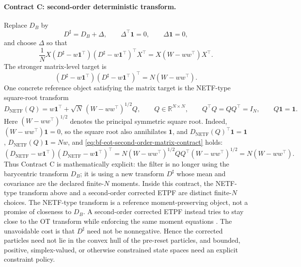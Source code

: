 \paragraph{Contract C: second-order deterministic transform.}
Replace \(D_B\) by
\begin{equation}
\label{eq:bf-eot-second-order-correction}
  D^\sharp = D_B+\Delta,
  \qquad
  \Delta^\top\mathbf 1=0,
  \qquad
  \Delta\mathbf 1=0,
\end{equation}
and choose \(\Delta\) so that
\begin{equation}
\label{eq:bf-eot-second-order-correction-cov}
  \frac1N X(D^\sharp-w\mathbf 1^\top)
  (D^\sharp-w\mathbf 1^\top)^\top X^\top
  =
  X(W-ww^\top)X^\top.
\end{equation}
The stronger matrix-level target is
\begin{equation}
\label{eq:bf-eot-second-order-correction-matrix}
  (D^\sharp-w\mathbf 1^\top)(D^\sharp-w\mathbf 1^\top)^\top
  =
  N(W-ww^\top).
\end{equation}
One concrete reference object satisfying the matrix target is the NETF-type
square-root transform
\begin{equation}
\label{eq:bf-eot-netf-reference-transform}
  D_{\mathrm{NETF}}(Q)
  =
  w\mathbf 1^\top
  +
  \sqrt{N}\,(W-ww^\top)^{1/2}Q,
  \qquad
  Q\in\mathbb R^{N\times N},
  \qquad
  Q^\top Q=QQ^\top=I_N,
  \qquad
  Q\mathbf 1=\mathbf 1.
\end{equation}
Here \((W-ww^\top)^{1/2}\) denotes the principal symmetric square root.  Indeed,
\((W-ww^\top)\mathbf 1=0\), so the square root also annihilates \(\mathbf 1\), and
\(D_{\mathrm{NETF}}(Q)^\top\mathbf 1=\mathbf 1\),
\(D_{\mathrm{NETF}}(Q)\mathbf 1=Nw\), and
\eqref{eq:bf-eot-second-order-matrix-contract} holds:
\[
  (D_{\mathrm{NETF}}-w\mathbf 1^\top)
  (D_{\mathrm{NETF}}-w\mathbf 1^\top)^\top
  =
  N(W-ww^\top)^{1/2}QQ^\top(W-ww^\top)^{1/2}
  =
  N(W-ww^\top).
\]
Thus Contract C is mathematically explicit: the filter is no longer using the
barycentric transform \(D_B\); it is using a new transform \(D^\sharp\) whose
mean and covariance are the declared finite-\(N\) moments.  Inside this contract,
the NETF-type transform above and a second-order corrected ETPF are distinct
finite-\(N\) choices.  The NETF-type transform is a reference moment-preserving
object, not a promise of closeness to \(D_B\).  A second-order corrected ETPF
instead tries to stay close to the OT transform while enforcing the same moment
equations
\citep{reich2013nonparametric,acevedodewiljesreich2017secondorder}.
The unavoidable cost is that \(D^\sharp\) need not be nonnegative.  Hence the
corrected particles need not lie in the convex hull of the pre-reset particles,
and bounded, positive, simplex-valued, or otherwise constrained state spaces need
an explicit constraint policy.

